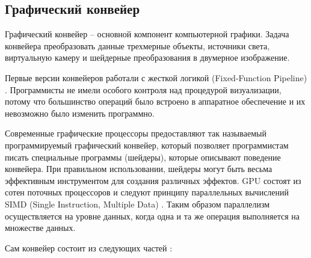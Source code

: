 \subsection{Графический конвейер}

Графический конвейер -- основной компонент компьютерной графики. Задача конвейера преобразовать
данные трехмерные объекты, источники света, виртуальную камеру и шейдерные преобразования в 
двумерное изображение.

Первые версии конвейеров работали с жесткой логикой (Fixed-Function Pipeline) \cite{raytracing02}.
Программисты не имели особого контроля над процедурой визуализации, потому что большинство
операций было встроено в аппаратное обеспечение и их невозможно было изменить программно.

Современные графические процессоры предоставляют так называемый программируемый графический
конвейер, который позволяет программистам писать специальные программы (шейдеры), которые
описывают поведение конвейера. При правильном использовании, шейдеры могут быть весьма эффективным
инструментом для создания различных эффектов. GPU состоят из сотен поточных процессоров и следуют
принципу параллельных вычислений SIMD (Single Instruction, Multiple Data) \cite{gpu}. Таким образом
параллелизм осуществляется на уровне данных, когда одна и та же операция выполняется
на множестве данных.

Сам конвейер состоит из следующих частей \cite{hgpuw}:

